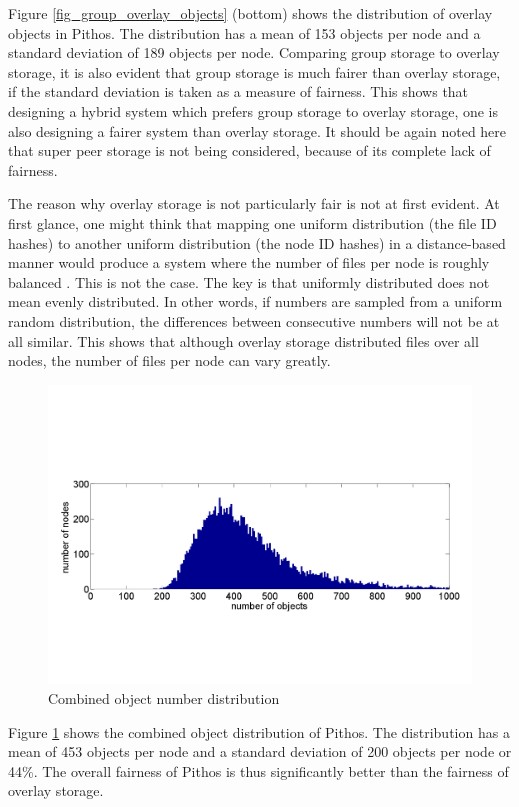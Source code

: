 \documentclass[10pt,a4paper,conference]{IEEEtran}
\begin{document}
%
Figure \ref{fig_group_overlay_objects} (bottom) shows the distribution of overlay objects in Pithos. The distribution has a mean of 153 objects per
node and a standard deviation of 189 objects per node. Comparing group storage to overlay storage, it is also evident that group storage is much
fairer than overlay storage, if the standard deviation is taken as a measure of fairness. This shows that designing a hybrid system which prefers
group storage to overlay storage, one is also designing a fairer system than overlay storage. It should be again noted here that super peer storage
is not being considered, because of its complete lack of fairness.

The reason why overlay storage is not particularly fair is not at first evident. At first glance, one might think that mapping one uniform
distribution (the file ID hashes) to another uniform distribution (the node ID hashes) in a distance-based manner would produce a system where the
number of files per node is roughly balanced \cite{storage_and_chaching_PAST}. This is not the case. The key is that uniformly distributed does not
mean evenly distributed. In other words, if numbers are sampled from a uniform random distribution, the differences between consecutive numbers will
not be at all similar. This shows that although overlay storage distributed files over all nodes, the number of files per node can vary greatly.

\begin{figure}[htbp]
 \centering
 \includegraphics[clip=true, viewport=1cm 5cm 29cm 14.5cm, width=\columnwidth]{Objects}
 \caption{Combined object number distribution}
 \label{fig_objects}
\end{figure}
%
Figure \ref{fig_objects} shows the combined object distribution of Pithos. The distribution has a mean of 453 objects per node and a standard
deviation of 200 objects per node or 44\%. The overall fairness of Pithos is thus significantly better than the fairness of overlay storage.
\end{document}
